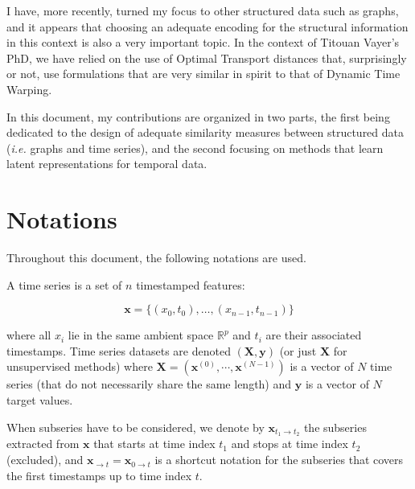 I have, more recently, turned my focus to other structured data such as graphs,
and it appears that choosing an adequate encoding for the structural information
in this context is also a very important topic.
In the context of Titouan Vayer's PhD, we have relied on the use of Optimal
Transport distances that, surprisingly
or not, use formulations that are very similar in spirit to that of
Dynamic Time Warping.

In this document, my contributions are organized in two
parts, the first being dedicated to the design of adequate similarity
measures between structured data (\emph{i.e.} graphs and time series), and the
second focusing on methods that
learn latent representations for temporal data.

\section*{Notations}

Throughout this document, the following notations are used.

A time series is a set of $n$ timestamped features:

\begin{equation}
    \mathbf{x} = \{ (x_0, t_0), \dots , (x_{n-1}, t_{n-1}) \}
\end{equation}

where all $x_i$ lie in the same ambient space $\mathbb{R}^{p}$ and $t_i$ are
their associated timestamps.
Time series datasets are denoted $(\mathbf{X}, \mathbf{y})$ (or just
$\mathbf{X}$ for unsupervised methods) where
$\mathbf{X} = \left( \mathbf{x}^{(0)}, \cdots, \mathbf{x}^{(N-1)} \right)$ is
a vector of $N$ time series (that do not necessarily share the same length) and
$\mathbf{y}$ is a vector of $N$ target values.

When subseries have to be considered, we denote by
$\mathbf{x}_{t_1 \rightarrow t_2}$ the subseries extracted from $\mathbf{x}$
that starts at time index $t_1$ and stops at time index $t_2$ (excluded), and
$\mathbf{x}_{\rightarrow t} = \mathbf{x}_{0 \rightarrow t}$ is a shortcut
notation for the subseries that covers the first timestamps up to time index
$t$.
